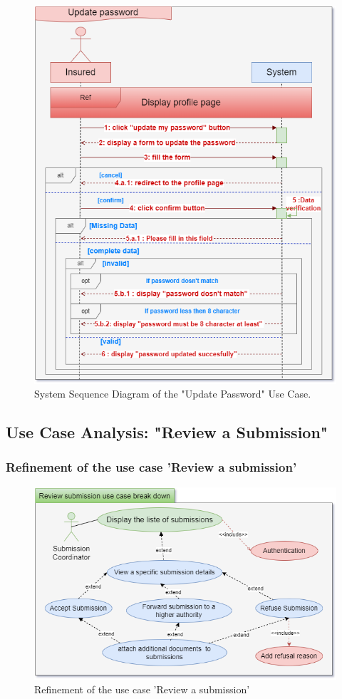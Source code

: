 \begin{figure}[h!]
    \centering
    \includegraphics[width=1\textwidth]{figures/sequpdate_password.png}
    \caption{System Sequence Diagram of the "Update Password" Use Case.}
\end{figure}
\clearpage

\subsection{Use Case Analysis: "Review a Submission"}
\subsubsection{Refinement of the use case 'Review a submission'}
\begin{figure}[h!]
    \centering
    \includegraphics[width=1\textwidth]{figures/bdreview_submission.drawio.png}
    \caption{Refinement of the use case 'Review a submission'}
\end{figure}\


